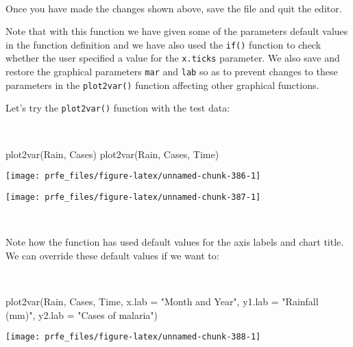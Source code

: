 \documentclass[
  12pt,
  a4paper]{book}
\newenvironment{Shaded}{\begin{snugshade}}{\end{snugshade}}
\newcommand{\AttributeTok}[1]{\textcolor[rgb]{0.77,0.63,0.00}{#1}}
\newcommand{\FunctionTok}[1]{\textcolor[rgb]{0.00,0.00,0.00}{#1}}
\newcommand{\NormalTok}[1]{#1}
\newcommand{\StringTok}[1]{\textcolor[rgb]{0.31,0.60,0.02}{#1}}
\begin{document}
~

Once you have made the changes shown above, save the file and quit the editor.

Note that with this function we have given some of the parameters default values in the function definition and we have also used the \texttt{if()} function to check whether the user specified a value for the \texttt{x.ticks} parameter. We also save and restore the graphical parameters \texttt{mar} and \texttt{lab} so as to prevent changes to these parameters in the \texttt{plot2var()} function affecting other graphical functions.

Let's try the \texttt{plot2var()} function with the test data:

~

\begin{Shaded}
\begin{Highlighting}[]
\FunctionTok{plot2var}\NormalTok{(Rain, Cases)}
\FunctionTok{plot2var}\NormalTok{(Rain, Cases, Time)}
\end{Highlighting}
\end{Shaded}

\begin{center}\texttt{[image: prfe\_files/figure-latex/unnamed-chunk-386-1]} \end{center}

\newpage

\begin{center}\texttt{[image: prfe\_files/figure-latex/unnamed-chunk-387-1]} \end{center}

~

Note how the function has used default values for the axis labels and chart title. We can override these default values if we want to:

~

\begin{Shaded}
\begin{Highlighting}[]
\FunctionTok{plot2var}\NormalTok{(Rain, Cases, Time, }\AttributeTok{x.lab =} \StringTok{"Month and Year"}\NormalTok{,}
         \AttributeTok{y1.lab =} \StringTok{"Rainfall (mm)"}\NormalTok{, }\AttributeTok{y2.lab =} \StringTok{"Cases of malaria"}\NormalTok{)}
\end{Highlighting}
\end{Shaded}

\begin{center}\texttt{[image: prfe\_files/figure-latex/unnamed-chunk-388-1]} \end{center}
\end{document}
